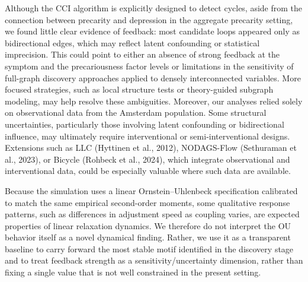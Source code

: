 \documentclass[
]{article}
\begin{document}
Although the CCI algorithm is explicitly designed to detect cycles,
aside from the connection between precarity and depression in the
aggregate precarity setting, we found little clear evidence of feedback:
most candidate loops appeared only as bidirectional edges, which may
reflect latent confounding or statistical imprecision. This could point
to either an absence of strong feedback at the symptom and the
precariousness factor levels or limitations in the sensitivity of
full-graph discovery approaches applied to densely interconnected
variables. More focused strategies, such as local structure tests or
theory-guided subgraph modeling, may help resolve these ambiguities.
Moreover, our analyses relied solely on observational data from the
Amsterdam population. Some structural uncertainties, particularly those
involving latent confounding or bidirectional influence, may ultimately
require interventional or semi-interventional designs. Extensions such
as LLC (Hyttinen et al., 2012), NODAGS-Flow (Sethuraman et al., 2023),
or Bicycle (Rohbeck et al., 2024), which integrate observational and
interventional data, could be especially valuable where such data are
available.

\textcolor{BrickRed}{Because the simulation uses a linear Ornstein–Uhlenbeck specification calibrated to match the same empirical second-order moments, some qualitative response patterns, such as differences in adjustment speed as coupling varies, are expected properties of linear relaxation dynamics. We therefore do not interpret the OU behavior itself as a novel dynamical finding. Rather, we use it as a transparent baseline to carry forward the most stable motif identified in the discovery stage and to treat feedback strength as a sensitivity/uncertainty dimension, rather than fixing a single value that is not well constrained in the present setting.}
\end{document}
